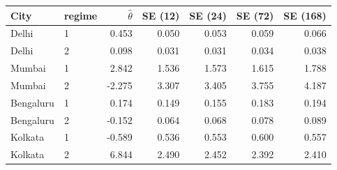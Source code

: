 \begin{tabular}{llrrrrr}
\toprule
City & regime & $\hat\theta$ & SE (12) & SE (24) & SE (72) & SE (168) \\
\midrule
Delhi & 1 & 0.453 & 0.050 & 0.053 & 0.059 & 0.066 \\
Delhi & 2 & 0.098 & 0.031 & 0.031 & 0.034 & 0.038 \\
Mumbai & 1 & 2.842 & 1.536 & 1.573 & 1.615 & 1.788 \\
Mumbai & 2 & -2.275 & 3.307 & 3.405 & 3.755 & 4.187 \\
Bengaluru & 1 & 0.174 & 0.149 & 0.155 & 0.183 & 0.194 \\
Bengaluru & 2 & -0.152 & 0.064 & 0.068 & 0.078 & 0.089 \\
Kolkata & 1 & -0.589 & 0.536 & 0.553 & 0.600 & 0.557 \\
Kolkata & 2 & 6.844 & 2.490 & 2.452 & 2.392 & 2.410 \\
\bottomrule
\end{tabular}